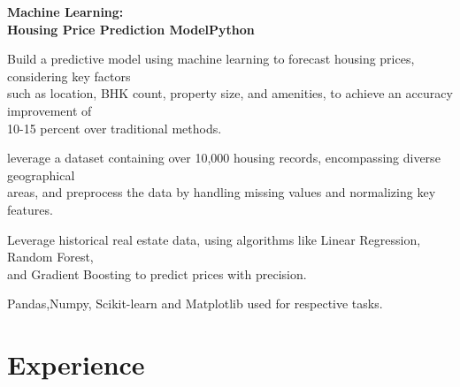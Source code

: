 \documentclass[letterpaper,10pt]{article}
\newcommand{\heading}[2]{
  \hspace{10pt}#1\hfill#2\\
}
\newcommand{\headingBf}[2]{
  \heading{\textbf{#1}}{\textbf{#2}}
}
\newenvironment{resume_list}{
  \vspace{-7pt}
  \begin{itemize}[itemsep=-2px, parsep=1pt, leftmargin=30pt]
}{
  \end{itemize}
}
\begin{document}
\headingBf{Machine Learning:}{}

\headingBf{Housing Price Prediction Model}{Python}
\begin{resume_list}
    \item Build a predictive model using machine learning to forecast housing prices, considering key factors \\such as location, BHK count, property size, and amenities, to achieve an accuracy improvement of \\10-15 percent over traditional methods.

    \item leverage a dataset containing over 10,000 housing records, encompassing diverse geographical \\areas, and preprocess the data by handling missing values and normalizing key features.

    \item Leverage historical real estate data, using algorithms like Linear Regression, Random Forest,\\ and Gradient Boosting to predict prices with precision.

    \item Pandas,Numpy, Scikit-learn and Matplotlib used for respective tasks.



\end{resume_list}


\section{Experience}
\end{document}
